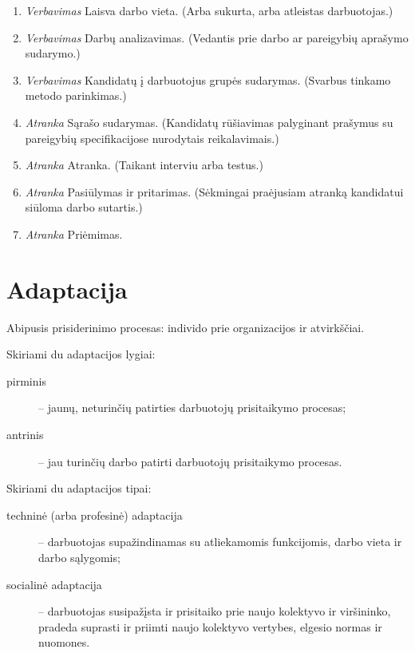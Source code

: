 \begin{enumerate}
  \item \emph{Verbavimas} Laisva darbo vieta. (Arba sukurta, arba
    atleistas darbuotojas.)
  \item \emph{Verbavimas} Darbų analizavimas. (Vedantis prie darbo ar
    pareigybių aprašymo sudarymo.)
  \item \emph{Verbavimas} Kandidatų į darbuotojus grupės sudarymas.
    (Svarbus tinkamo metodo parinkimas.)
  \item \emph{Atranka} Sąrašo sudarymas. (Kandidatų rūšiavimas
    palyginant prašymus su pareigybių specifikacijose nurodytais
    reikalavimais.)
  \item \emph{Atranka} Atranka. (Taikant interviu arba testus.)
  \item \emph{Atranka} Pasiūlymas ir pritarimas. (Sėkmingai
    praėjusiam atranką kandidatui siūloma darbo sutartis.)
  \item \emph{Atranka} Priėmimas.
\end{enumerate}

\section{Adaptacija}

\begin{defn}[Adaptacija]
  Abipusis prisiderinimo procesas: individo prie organizacijos ir
  atvirkščiai.
\end{defn}

Skiriami du adaptacijos lygiai:
\begin{description}
  \item[pirminis] – jaunų, neturinčių patirties darbuotojų prisitaikymo
    procesas;
  \item[antrinis] – jau turinčių darbo patirti darbuotojų prisitaikymo
    procesas.
\end{description}

Skiriami du adaptacijos tipai:
\begin{description}
  \item[techninė (arba profesinė) adaptacija] – darbuotojas supažindinamas
    su atliekamomis funkcijomis, darbo vieta ir darbo sąlygomis;
  \item[socialinė adaptacija] – darbuotojas susipažįsta ir prisitaiko
    prie naujo kolektyvo ir viršininko, pradeda suprasti ir priimti
    naujo kolektyvo vertybes, elgesio normas ir nuomones.
\end{description}

